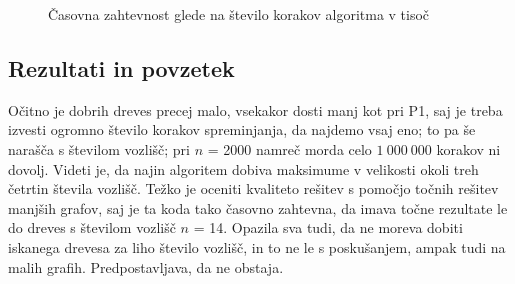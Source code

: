 \documentclass[a4paper, 12 pt]{article}
\begin{document}
\begin{figure}[H]
    \centering
    \qquad
    \caption{Časovna zahtevnost glede na število korakov algoritma v tisoč}
    \label{p2korak}
\end{figure}


\subsection{Rezultati in povzetek}

Očitno je dobrih dreves precej malo, vsekakor dosti manj kot pri P1, saj je treba izvesti ogromno število korakov spreminjanja, da najdemo vsaj eno; to pa še narašča s številom vozlišč; pri $n$ = 2000 namreč morda celo $1 \ 000 \ 000$ korakov ni dovolj. Videti je, da najin algoritem dobiva maksimume v velikosti okoli treh četrtin števila vozlišč. Težko je oceniti kvaliteto rešitev s pomočjo točnih rešitev manjših grafov, saj je ta koda tako časovno zahtevna, da imava točne rezultate le do dreves s številom vozlišč $n$ = 14. Opazila sva tudi, da ne moreva dobiti iskanega drevesa za liho število vozlišč, in to ne le s poskušanjem, ampak tudi na malih grafih. Predpostavljava, da ne obstaja.
\end{document}
